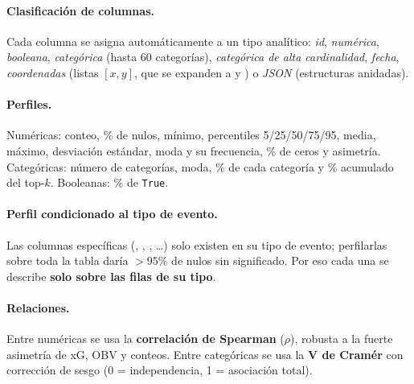 \documentclass[11pt,a4paper]{article}
\DeclareRobustCommand{\col}[1]{\texttt{\detokenize{#1}}}
\begin{document}
\paragraph{Clasificación de columnas.} Cada columna se asigna automáticamente a un tipo analítico: \emph{id}, \emph{numérica}, \emph{booleana}, \emph{categórica} (hasta 60 categorías), \emph{categórica de alta cardinalidad}, \emph{fecha}, \emph{coordenadas} (listas $[x,y]$, que se expanden a \col{_x} y \col{_y}) o \emph{JSON} (estructuras anidadas).

\paragraph{Perfiles.} Numéricas: conteo, \% de nulos, mínimo, percentiles 5/25/50/75/95, media, máximo, desviación estándar, moda y su frecuencia, \% de ceros y asimetría. Categóricas: número de categorías, moda, \% de cada categoría y \% acumulado del top-$k$. Booleanas: \% de \texttt{True}.

\paragraph{Perfil condicionado al tipo de evento.} Las columnas específicas (\col{pass_*}, \col{shot_*}, \col{duel_*}, \ldots) solo existen en su tipo de evento; perfilarlas sobre toda la tabla daría $>95\%$ de nulos sin significado. Por eso cada una se describe \textbf{solo sobre las filas de su tipo}.

\paragraph{Relaciones.} Entre numéricas se usa la \textbf{correlación de Spearman} ($\rho$), robusta a la fuerte asimetría de xG, OBV y conteos. Entre categóricas se usa la \textbf{V de Cramér} con corrección de sesgo (0 = independencia, 1 = asociación total).
\end{document}
